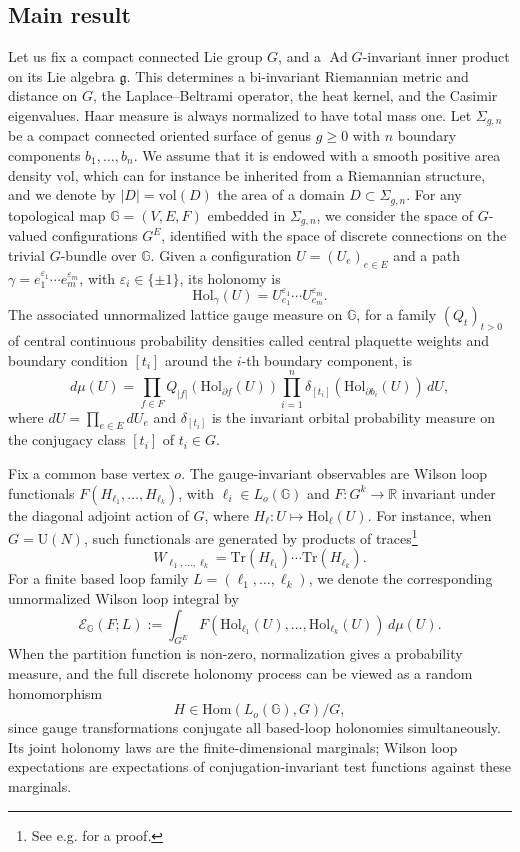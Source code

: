 \documentclass[11pt,a4paper,reqno]{article}
\theoremstyle{definition}
\theoremstyle{remark}
\newcommand\U{{\mathrm U}}
\newcommand\R{\mathbb{R}}
\newcommand\Tr{\mathrm{Tr}}
\newcommand\vol{\mathrm{vol}}
\newcommand\Hom{\mathrm{Hom}}
\newcommand\Gbb{{\mathbb{G}}}
\newcommand\Hol{{\mathrm{Hol}}}
\begin{document}
\subsection{Main result}

Let us fix a compact connected Lie group $G$, and a $\operatorname{Ad}G$-invariant inner product on its Lie algebra $\mathfrak g$. This determines a bi-invariant Riemannian metric and distance on $G$, the Laplace--Beltrami operator, the heat kernel, and the Casimir eigenvalues. Haar measure is always normalized to have total mass one. Let $\Sigma_{g,n}$ be a compact connected oriented surface of genus $g\geq0$ with $n$ boundary components $b_1,\ldots,b_n$. We assume that it is endowed with a smooth positive area density $\vol$, which can for instance be inherited from a Riemannian structure, and we denote by $|D|=\vol(D)$ the area of a domain $D\subset\Sigma_{g,n}$. For any topological map $\Gbb=(V,E,F)$ embedded in $\Sigma_{g,n}$, we consider the space of $G$-valued configurations $G^E$, identified with the space of discrete connections on the trivial $G$-bundle over $\Gbb$. Given a configuration $U=(U_e)_{e\in E}$ and a path $\gamma=e_1^{\varepsilon_1}\cdots e_m^{\varepsilon_m}$, with $\varepsilon_i\in\{\pm1\}$, its holonomy is
\[
 \Hol_\gamma(U)=U_{e_1}^{\varepsilon_1}\cdots U_{e_m}^{\varepsilon_m}.
\]
 The associated unnormalized lattice gauge measure on $\Gbb$, for a family $(Q_t)_{t>0}$ of central continuous probability densities called central plaquette weights and boundary condition $[t_i]$ around the $i$-th boundary component, is
\[
 d\mu(U)=\prod_{f\in F}Q_{|f|}(\Hol_{\partial f}(U))
 \prod_{i=1}^n\delta_{[t_i]}(\Hol_{\partial b_i}(U))\,dU,
\]
where $dU=\prod_{e\in E}dU_e$ and $\delta_{[t_i]}$ is the invariant orbital probability measure on the conjugacy class $[t_i]$ of $t_i\in G$. 

Fix a common base vertex $o$. The gauge-invariant observables are Wilson loop functionals $F(H_{\ell_1},\ldots,H_{\ell_k})$, with $\ell_i\in L_o(\Gbb)$ and $F:G^k\to\R$ invariant under the diagonal adjoint action of $G$, where $H_\ell:U\mapsto\Hol_\ell(U)$. For instance, when $G=\U(N)$, such functionals are generated by products of traces\footnote{See e.g. \cite{Lev04} for a proof.}
\[
 W_{\ell_1,\ldots,\ell_k}=\Tr(H_{\ell_1})\cdots\Tr(H_{\ell_k}).
\]
For a finite based loop family $L=(\ell_1,\ldots,\ell_k)$, we denote the corresponding unnormalized Wilson loop integral by
\[
 \mathcal E_{\Gbb}(F;L)
 :=\int_{G^E}F(\Hol_{\ell_1}(U),\ldots,\Hol_{\ell_k}(U))\,d\mu(U).
\]
When the partition function is non-zero, normalization gives a probability measure, and the full discrete holonomy process can be viewed as a random homomorphism
\[
 H\in\Hom(L_o(\Gbb),G)/G,
\]
since gauge transformations conjugate all based-loop holonomies simultaneously. Its joint holonomy laws are the finite-dimensional marginals; Wilson loop expectations are expectations of conjugation-invariant test functions against these marginals.
\end{document}
